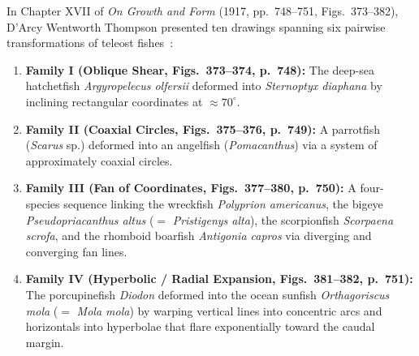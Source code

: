 \documentclass[11pt,a4paper]{article}
\theoremstyle{definition}
\theoremstyle{remark}
\begin{document}
In Chapter XVII of \emph{On Growth and Form} (1917, pp.\ 748--751, Figs.\ 373--382), D'Arcy Wentworth Thompson presented ten drawings spanning six pairwise transformations of teleost fishes~\cite{Thompson1917}:
\begin{enumerate}
  \item \textbf{Family I (Oblique Shear, Figs.\ 373--374, p.\ 748):} The deep-sea hatchetfish \emph{Argyropelecus olfersii} deformed into \emph{Sternoptyx diaphana} by inclining rectangular coordinates at $\approx 70^\circ$.
  \item \textbf{Family II (Coaxial Circles, Figs.\ 375--376, p.\ 749):} A parrotfish (\emph{Scarus} sp.) deformed into an angelfish (\emph{Pomacanthus}) via a system of approximately coaxial circles.
  \item \textbf{Family III (Fan of Coordinates, Figs.\ 377--380, p.\ 750):} A four-species sequence linking the wreckfish \emph{Polyprion americanus}, the bigeye \emph{Pseudopriacanthus altus} ($=$ \emph{Pristigenys alta}), the scorpionfish \emph{Scorpaena scrofa}, and the rhomboid boarfish \emph{Antigonia capros} via diverging and converging fan lines.
  \item \textbf{Family IV (Hyperbolic / Radial Expansion, Figs.\ 381--382, p.\ 751):} The porcupinefish \emph{Diodon} deformed into the ocean sunfish \emph{Orthagoriscus mola} ($=$ \emph{Mola mola}) by warping vertical lines into concentric arcs and horizontals into hyperbolae that flare exponentially toward the caudal margin.
\end{enumerate}
\end{document}
